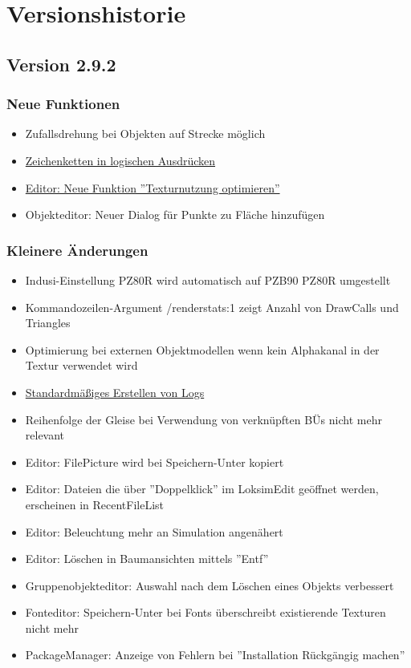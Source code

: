\section{Versionshistorie}
\subsection{Version 2.9.2}
\subsubsection{Neue Funktionen}
\begin{itemize}
\item Zufallsdrehung bei Objekten auf Strecke möglich
\item \hyperref[sec.editor.obj.logischeausdruecke]{Zeichenketten in logischen Ausdrücken}
\item \hyperref[sec:editor-texturnutzung-optimieren]{Editor: Neue Funktion ''Texturnutzung optimieren''}
\item Objekteditor: Neuer Dialog für Punkte zu Fläche hinzufügen
\end{itemize}

\subsubsection{Kleinere Änderungen}
\begin{itemize}
\item Indusi-Einstellung PZ80R wird automatisch auf PZB90 PZ80R umgestellt
\item Kommandozeilen-Argument /renderstats:1 zeigt Anzahl von DrawCalls und Triangles
\item Optimierung bei externen Objektmodellen wenn kein Alphakanal in der Textur verwendet wird
\item \hyperref[sec:editor-logging]{Standardmäßiges Erstellen von Logs}
\item Reihenfolge der Gleise bei Verwendung von verknüpften BÜs nicht mehr relevant
\item Editor: FilePicture wird bei Speichern-Unter kopiert
\item Editor: Dateien die über ''Doppelklick'' im LoksimEdit geöffnet werden, erscheinen in RecentFileList
\item Editor: Beleuchtung mehr an Simulation angenähert
\item Editor: Löschen in Baumansichten mittels ''Entf''
\item Gruppenobjekteditor: Auswahl nach dem Löschen eines Objekts verbessert
\item Fonteditor: Speichern-Unter bei Fonts überschreibt existierende Texturen nicht mehr
\item PackageManager: Anzeige von Fehlern bei ''Installation Rückgängig machen''
\end{itemize}


